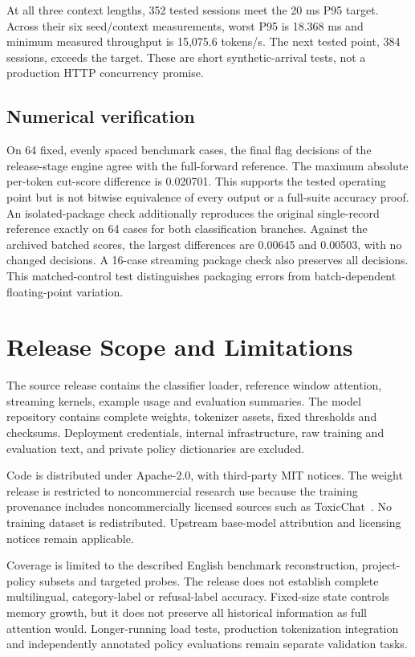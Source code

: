 \documentclass[11pt]{article}
\begin{document}
At all three context lengths, 352 tested sessions meet the 20 ms P95 target. Across their six seed/context measurements, worst P95 is 18.368 ms and minimum measured throughput is 15,075.6 tokens/s. The next tested point, 384 sessions, exceeds the target. These are short synthetic-arrival tests, not a production HTTP concurrency promise.

\subsection{Numerical verification}
On 64 fixed, evenly spaced benchmark cases, the final flag decisions of the release-stage engine agree with the full-forward reference. The maximum absolute per-token cut-score difference is 0.020701. This supports the tested operating point but is not bitwise equivalence of every output or a full-suite accuracy proof. An isolated-package check additionally reproduces the original single-record reference exactly on 64 cases for both classification branches. Against the archived batched scores, the largest differences are 0.00645 and 0.00503, with no changed decisions. A 16-case streaming package check also preserves all decisions. This matched-control test distinguishes packaging errors from batch-dependent floating-point variation.

\section{Release Scope and Limitations}
The source release contains the classifier loader, reference window attention, streaming kernels, example usage and evaluation summaries. The model repository contains complete weights, tokenizer assets, fixed thresholds and checksums. Deployment credentials, internal infrastructure, raw training and evaluation text, and private policy dictionaries are excluded.

Code is distributed under Apache-2.0, with third-party MIT notices. The weight release is restricted to noncommercial research use because the training provenance includes noncommercially licensed sources such as ToxicChat~\cite{toxicchat}. No training dataset is redistributed. Upstream base-model attribution and licensing notices remain applicable.

Coverage is limited to the described English benchmark reconstruction, project-policy subsets and targeted probes. The release does not establish complete multilingual, category-label or refusal-label accuracy. Fixed-size state controls memory growth, but it does not preserve all historical information as full attention would. Longer-running load tests, production tokenization integration and independently annotated policy evaluations remain separate validation tasks.
\end{document}
